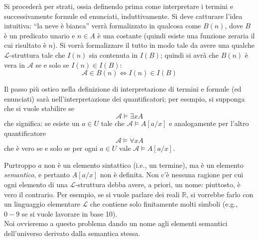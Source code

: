 Si procederà per strati, ossia definendo prima come interpretare 
i termini e successivamente formule ed enunciati, induttivamente. 
Si deve catturare l'idea intuitiva: ``la neve è bianca'' verrà 
formalizzato in qualcosa come $B(n)$, dove $B$ è un predicato 
unario e $n \in A$ è una costante (quindi esiste una funzione zeraria 
il cui risultato è $n$). Si vorrà formalizzare il tutto in modo tale da avere una 
qualche $\mathscr{L}$-struttura tale che $I(n)$ sia contenuta in $I(B)$; quindi si avrà che 
$B(n)$ è vera in $\mathscr{A}$ se e solo se $I(n) \in I(B)$: 
$$
\mathscr{A} \in B(n) \iff I(n) \in I(B)
$$

Il passo più ostico nella definizione di interpretazione di termini 
e formule (ed enunciati) sarà nell'interpretazione dei quantificatori; 
per esempio, si supponga che si vuole stabilire se 
$$
\mathscr{A} \models \exists x A
$$
che significa: se esiste un $a \in U$ tale che $\mathscr{A} \models A[a/x]$
e  analogamente per l'altro quantificatore 
$$
\mathscr{A} \models \forall x A
$$
che è vero se e solo se per ogni $a \in U$ vale $\mathscr{A} \models A[a/x]$. 

Purtroppo $a$ non è un elemento sintattico (i.e., un termine), ma è un elemento \textit{semantico}, e pertanto $A[a/x]$ non è definita.
Non c'è nessuna ragione per cui ogni elemento di una $\mathscr{L}$-struttura debba avere, a priori, un nome: piuttosto, è vero il contrario. Per esempio, se si vuole parlare dei reali $\mathbb{R}$, si vorrebbe farlo con un linguaggio elementare $\mathscr{L}$ che contiene solo finitamente molti simboli (e.g., $0-9$ se si vuole lavorare in base 10). \\
Noi ovvieremo a questo problema dando un nome agli elementi semantici dell'universo derivato dalla semantica stessa.

